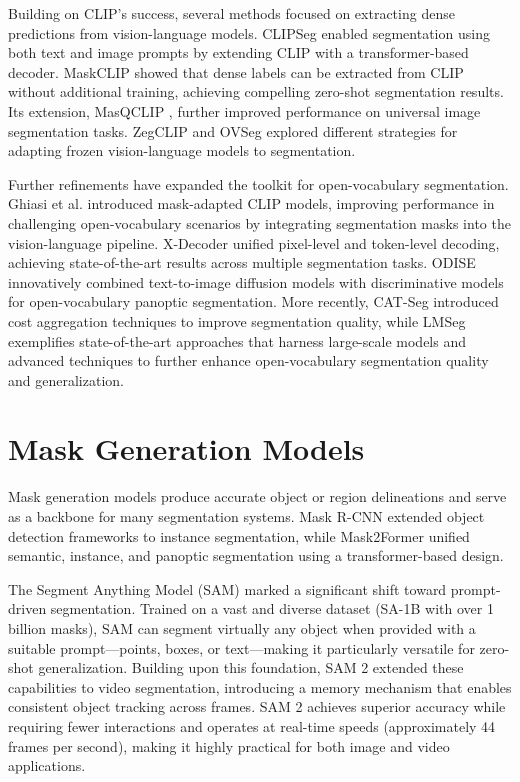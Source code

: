 Building on CLIP's success, several methods focused on extracting dense predictions from vision-language models. CLIPSeg \cite{luddecke2022clipseg} enabled segmentation using both text and image prompts by extending CLIP with a transformer-based decoder. MaskCLIP \cite{zhou2022extract} showed that dense labels can be extracted from CLIP without additional training, achieving compelling zero-shot segmentation results. Its extension, MasQCLIP \cite{xu2023masqclip}, further improved performance on universal image segmentation tasks. ZegCLIP \cite{zhang2022zegclip} and OVSeg \cite{liang2023ovseg} explored different strategies for adapting frozen vision-language models to segmentation.

Further refinements have expanded the toolkit for open-vocabulary segmentation. Ghiasi et al. \cite{ghiasi2022open} introduced mask-adapted CLIP models, improving performance in challenging open-vocabulary scenarios by integrating segmentation masks into the vision-language pipeline. X-Decoder \cite{zou2023xdecoder} unified pixel-level and token-level decoding, achieving state-of-the-art results across multiple segmentation tasks. ODISE \cite{xu2023odise} innovatively combined text-to-image diffusion models with discriminative models for open-vocabulary panoptic segmentation. More recently, CAT-Seg \cite{cho2024catseg} introduced cost aggregation techniques to improve segmentation quality, while LMSeg \cite{LMSeg2024} exemplifies state-of-the-art approaches that harness large-scale models and advanced techniques to further enhance open-vocabulary segmentation quality and generalization.

\section{Mask Generation Models}
Mask generation models produce accurate object or region delineations and serve as a backbone for many segmentation systems. Mask R-CNN \cite{he2017mask} extended object detection frameworks to instance segmentation, while Mask2Former \cite{cheng2022mask2former} unified semantic, instance, and panoptic segmentation using a transformer-based design.

The Segment Anything Model (SAM) \cite{kirillov2023segment} marked a significant shift toward prompt-driven segmentation. Trained on a vast and diverse dataset (SA-1B with over 1 billion masks), SAM can segment virtually any object when provided with a suitable prompt—points, boxes, or text—making it particularly versatile for zero-shot generalization. Building upon this foundation, SAM 2 \cite{ravi2024sam2} extended these capabilities to video segmentation, introducing a memory mechanism that enables consistent object tracking across frames. SAM 2 achieves superior accuracy while requiring fewer interactions and operates at real-time speeds (approximately 44 frames per second), making it highly practical for both image and video applications.

